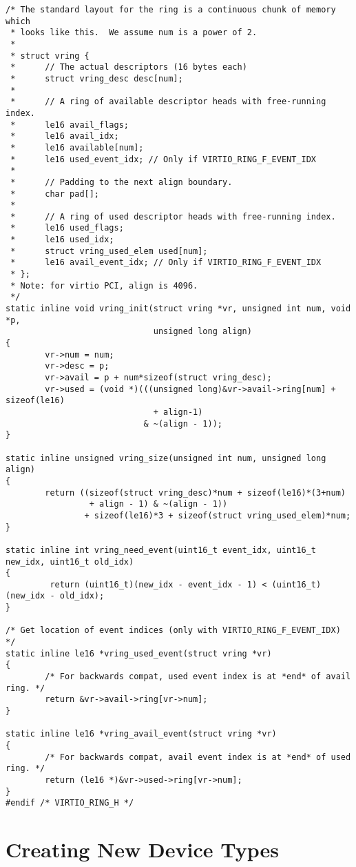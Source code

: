 \begin{lstlisting}
/* The standard layout for the ring is a continuous chunk of memory which
 * looks like this.  We assume num is a power of 2.
 *
 * struct vring {
 *      // The actual descriptors (16 bytes each)
 *      struct vring_desc desc[num];
 *
 *      // A ring of available descriptor heads with free-running index.
 *      le16 avail_flags;
 *      le16 avail_idx;
 *      le16 available[num];
 *      le16 used_event_idx; // Only if VIRTIO_RING_F_EVENT_IDX
 *
 *      // Padding to the next align boundary.
 *      char pad[];
 *
 *      // A ring of used descriptor heads with free-running index.
 *      le16 used_flags;
 *      le16 used_idx;
 *      struct vring_used_elem used[num];
 *      le16 avail_event_idx; // Only if VIRTIO_RING_F_EVENT_IDX
 * };
 * Note: for virtio PCI, align is 4096.
 */
static inline void vring_init(struct vring *vr, unsigned int num, void *p,
                              unsigned long align)
{
        vr->num = num;
        vr->desc = p;
        vr->avail = p + num*sizeof(struct vring_desc);
        vr->used = (void *)(((unsigned long)&vr->avail->ring[num] + sizeof(le16)
                              + align-1)
                            & ~(align - 1));
}

static inline unsigned vring_size(unsigned int num, unsigned long align)
{
        return ((sizeof(struct vring_desc)*num + sizeof(le16)*(3+num)
                 + align - 1) & ~(align - 1))
                + sizeof(le16)*3 + sizeof(struct vring_used_elem)*num;
}

static inline int vring_need_event(uint16_t event_idx, uint16_t new_idx, uint16_t old_idx)
{
         return (uint16_t)(new_idx - event_idx - 1) < (uint16_t)(new_idx - old_idx);
}

/* Get location of event indices (only with VIRTIO_RING_F_EVENT_IDX) */
static inline le16 *vring_used_event(struct vring *vr)
{
        /* For backwards compat, used event index is at *end* of avail ring. */
        return &vr->avail->ring[vr->num];
}

static inline le16 *vring_avail_event(struct vring *vr)
{
        /* For backwards compat, avail event index is at *end* of used ring. */
        return (le16 *)&vr->used->ring[vr->num];
}
#endif /* VIRTIO_RING_H */
\end{lstlisting}



\chapter{Creating New Device Types}\label{sec:Creating New Device Types}

